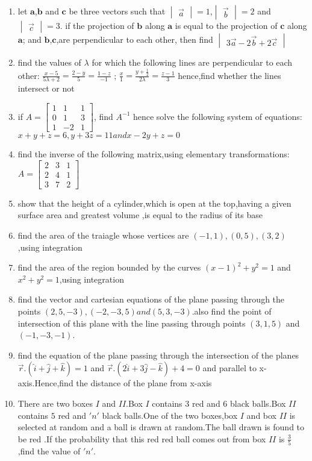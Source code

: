 \documentclass[2pt,-letter paper]{article}
\let\vec\mathbf{}
\let\vec\mathbf{}
\let\vec\mathbf{}
\providecommand{\mydet}[1]{\ensuremath{\begin{vmatrix}#1\end{vmatrix}}}
\providecommand{\myvec}[1]{\ensuremath{\begin{bmatrix}#1\end{bmatrix}}}
\providecommand{\brak}[1]{\ensuremath{\left(#1\right)}}
\begin{document}
\begin{enumerate}
\item let $\vec{a}$,$\vec{b}$ and $\vec{c}$ be three vectors such that $\mydet{\overrightarrow{a}}=1$,$\mydet{\overrightarrow{b}}=2$ and $\mydet{\overrightarrow{c}}=3$. if the projection of $\vec{b}$ along $\vec{a}$ is equal to the projection of $\vec{c}$ along $\vec{a}$; and $\vec{b}$,$\vec{c}$,are perpendicular to each other, then find $\mydet{3\overrightarrow{a}-2\overrightarrow{b}+2\overrightarrow{c}}$
\item find the values of $\lambda$ for which the following lines are perpendicular to each other:
	$\frac{x-5}{5\lambda+2}=\frac{2-y}{5}=\frac{1-z}{-1}$ ; $\frac{x}{1}=\frac{y+\frac{1}{2}}{2\lambda}=\frac{z-1}{3}$
		hence,find whether the lines intersect or not
\item if $A=\myvec{1 & 1 & 1\\
	           0 & 1 & 3\\
		   1 &-2 & 1 }$, find  $A^{-1}$ hence solve the following system of equations:
		   $x+y+z=6,
		   y+3z=11
		   and x-2y+z=0 $
\item find the inverse of the following matrix,using elementary transformations:
	$A=\myvec{2 & 3 & 1\\
		  2 & 4 & 1\\
		  3 & 7 & 2}$
\item show that the height of a cylinder,which is open at the top,having a given surface area and greatest volume ,is equal to the radius of its base
\item find the area of the traiagle whose vertices are $\brak{-1,1},\brak{0,5},\brak{3,2}$,using integration 
\item find the area of the region bounded by the curves $\brak{x-1}^2+y^2=1$ and $x^2+y^2=1$,using integration
\item find the vector and cartesian equations of the plane passing through the points $\brak{2,5,-3},\brak{-2,-3,5} and \brak{5,3,-3}$.also find the point of intersection of this plane with the line passing through points $\brak{3,1,5}$ and $\brak{-1 ,-3,-1}$.
\item find the equation of the plane passing through the intersection of the planes $\overrightarrow{r}. \brak{\hat{i}+\hat{j}+\hat{k}}=1$ and $\overrightarrow{r} . \brak{2\hat{i}+3\hat{j}-\hat{k}}+4=0$ and parallel to x-axis.Hence,find the distance of the plane from x-axis 
\item There are two boxes $I$ and $II$.Box $I$ contains $3$ red and $6$ black balls.Box $II$ contains $5$ red and $'n'$ black balls.One of the two boxes,box $I$ and box $II$ is selected at random and a ball is drawn at random.The ball drawn is found to be red .If the probability that this red red ball comes out from box $II$ is $\frac{3}{5}$,find the value of $'n'$.

\end{enumerate}
\end{document}
